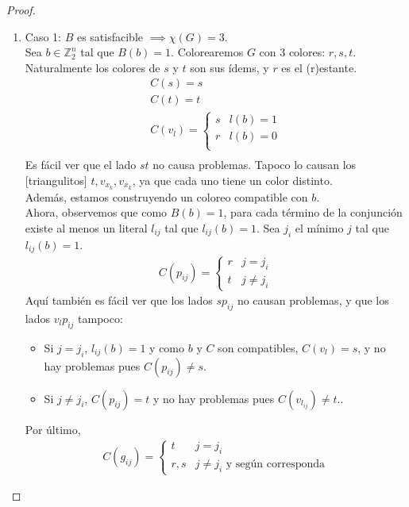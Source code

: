 \begin{proof}
\begin{enumerate}
    \item Caso 1: $B$ es satisfacible $\implies \chi(G) = 3$.\\
    Sea $b \in \mathbb{Z}_2^n$ tal que $B(b) = 1$. Colorearemos $G$ con 3 colores: $r,s,t$. Naturalmente los colores de $s$ y $t$ son sus ídems, y $r$ es el (r)estante.
    \begin{align}
    C(s) = s\\
    C(t) = t\\
    C(v_l) =
    \left\{
        \begin{array}{cc}
            s & l(b) = 1\\
            r & l(b) = 0\\
        \end{array}
    \right.\\
    \end{align}
    Es fácil ver que el lado $st$ no causa problemas. Tapoco lo causan los [triangulitos] $t, v_{x_k}, v_{\overline{x}_k}$, ya que cada uno tiene un color distinto.\\
    Además, estamos construyendo un coloreo compatible con $b$.\\
    Ahora, observemos que como $B(b) = 1$, para cada término de la conjunción existe al menos un literal $l_{ij}$ tal que $l_{ij}(b) = 1$. Sea $j_i$ el mínimo $j$ tal que $l_{ij}(b) = 1$.
    \begin{align}
    C(p_{ij}) =
    \left\{
        \begin{array}{cc}
            r & j = j_i\\
            t & j \neq j_i
        \end{array}
    \right.
    \end{align}
    Aquí también es fácil ver que los lados $sp_{ij}$ no causan problemas, y que los lados $v_lp_{ij}$ tampoco:
    \begin{itemize}
        \item Si $j = j_i$, $l_{ij}(b) = 1$ y como $b$ y $C$ son compatibles, $C(v_l) = s$, y no hay problemas pues $C(p_{ij}) \neq s$.
        \item Si $j \neq j_i$, $C(p_{ij}) = t$ y no hay problemas pues $C(v_{l_{ij}}) \neq t$..
    \end{itemize}
    Por último,
    \begin{align}
    C(g_{ij}) =
    \left\{
        \begin{array}{cc}
            t & j = j_i\\
            r,s & j \neq j_i \text{ y según corresponda}

\end{array}
\end{align}
\end{enumerate}
\end{proof}
